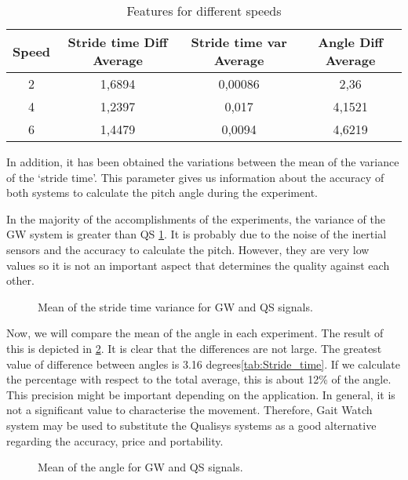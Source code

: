 \begin{table}[h]
	\caption{Features for different speeds}	
	\centering
	\begin{tabular}{|c|c|c|c|}\hline
		
		Speed & Stride time Diff Average & Stride time var Average & Angle Diff Average	 	\\ \hline
		2  & 1,6894	 & 0,00086 & 2,36 \\
		4 & 1,2397	& 0,017 & 4,1521\\
		6 & 1,4479 & 0,0094	& 4,6219
		\\ \hline
	\end{tabular}
	\label{tab:speeds}
	
\end{table}

In addition, it has been obtained the variations between the mean of the variance of the ‘stride time’. This parameter gives us information about the accuracy of both systems to calculate the pitch angle during the experiment.

In the majority of the accomplishments of the experiments, the variance of the GW system is greater than QS \ref{fig:var_stride_time}. It is probably due to the noise of the inertial sensors and the accuracy to calculate the pitch. However, they are very low values so it is not an important aspect that determines the quality against each other. 

\begin{figure}[H]
	\centering
	\caption{Mean of the stride time variance for GW and QS signals.}
	\label{fig:var_stride_time}
\end{figure}

Now, we will compare the mean of the angle in each experiment. The result of this is depicted in \ref{fig:mean_angle}. It is clear that the differences are not large. The greatest value of difference between angles is 3.16 degrees\ref{tab:Stride_time}. If we calculate the percentage with respect to the total average, this is about 12\% of the angle. This precision might be important depending on the application. In general, it is not a significant value to characterise the movement. Therefore, Gait Watch system may be used to substitute the Qualisys systems as a good alternative regarding the accuracy, price and portability.

\begin{figure}[H]
	\centering
	\caption{Mean of the angle for GW and QS signals.}
	\label{fig:mean_angle}
\end{figure}

